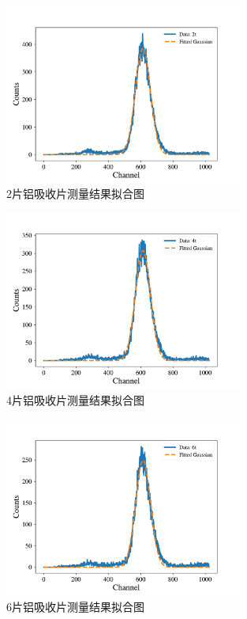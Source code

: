 \documentclass{article}
\begin{document}
    \begin{figure}[htbp]
        \centering
        \includegraphics[width=0.7\textwidth]{../plot/Fitted_2t.pdf}
        \caption{2片铝吸收片测量结果拟合图\label{fig:Fitted_2t}}
    \end{figure}
    \begin{figure}[htbp]
        \centering
        \includegraphics[width=0.7\textwidth]{../plot/Fitted_4t.pdf}
        \caption{4片铝吸收片测量结果拟合图\label{fig:Fitted_4t}}
    \end{figure}
    \begin{figure}[htbp]
        \centering
        \includegraphics[width=0.7\textwidth]{../plot/Fitted_6t.pdf}
        \caption{6片铝吸收片测量结果拟合图\label{fig:Fitted_6t}}
    \end{figure}
\end{document}
